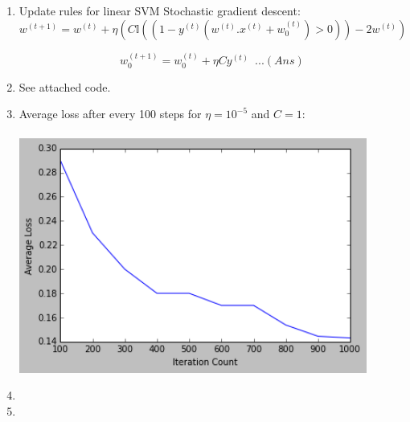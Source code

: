 \documentclass[letterpaper]{article}
\begin{document}
\begin{enumerate}

\item Update rules for linear SVM Stochastic gradient descent: 
\begin{equation}
w^{(t+1)} = w^{(t)} + \eta  (C  \mathbb{I}((1-y^{(t)}(w^{(t)}.x^{(t)} + w_0^{(t)}) > 0)) - 2w^{(t)})
\end{equation}

\begin{equation}
w_0^{(t+1)} = w_0^{(t)} + \eta  C  y^{(t)} \,\,\,  ...(Ans)
\end{equation}

\item See attached code.

\item Average loss after every 100 steps for $\eta = 10^{-5}$ and $C = 1$: \\ \\ 
\includegraphics[width = 4.5in, keepaspectratio]{HW3_figure6.png}

\item

\item

\end{enumerate}
\end{document}
